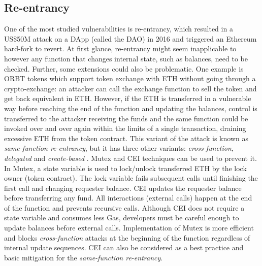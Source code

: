 \subsection{Re-entrancy}\label{subsec:ent}
One of the most studied vulnerabilities is re-entrancy, which resulted in a US\$50M attack on a DApp (called the DAO) in 2016 and triggered an Ethereum hard-fork to revert\cite{DAO1}. At first glance, re-entrancy might seem inapplicable to \erc however any function that changes internal state, such as balances, need to be checked. Further, some \erc extensions could also be problematic. {\blue One example is ORBT tokens\cite{ORBTToken} which support token exchange with ETH without going through a crypto-exchange\cite{ORBT}}: an attacker can call the exchange function to sell the token and get back equivalent in ETH. However, if the ETH is transferred in a vulnerable way before reaching the end of the function and updating the balances, control is transferred to the attacker receiving the funds and the same function could be invoked over and over again within the limits of a single transaction, draining excessive ETH from the token contract. This variant of the attack is known as \textit{same-function re-entrancy}, but it has three other variants: \textit{cross-function}, \textit{delegated} and \textit{create-based} \cite{SEREUM}. Mutex\cite{WiKiMutex} and CEI\cite{SolidtyDocSec} techniques can be used to prevent it. In Mutex, a state variable is used to lock/unlock transferred ETH by the lock owner (\ie token contract). The lock variable fails subsequent calls until finishing the first call and changing requester balance. CEI updates the requester balance before transferring any fund. All interactions (\ie external calls) happen at the end of the function and prevents recursive calls. Although CEI does not require a state variable and consumes less Gas, developers must be careful enough to update balances before external calls. { \blue Implementation of Mutex is more efficient and blocks \textit{cross-function} attacks at the beginning of the function regardless of internal update sequences. CEI can also be considered as a best practice and basic mitigation for the \textit{same-function re-entrancy}.}

